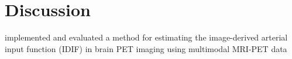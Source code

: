 \chapter{Discussion}
implemented and evaluated a method for estimating the image-derived arterial input function (IDIF) in brain PET imaging using multimodal MRI-PET data
